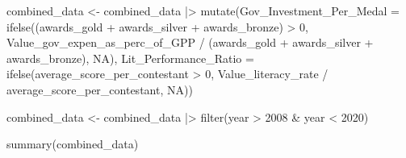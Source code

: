 \documentclass[
  letterpaper,
  DIV=11,
  numbers=noendperiod]{scrartcl}
\newenvironment{Shaded}{\begin{snugshade}}{\end{snugshade}}
\newcommand{\AttributeTok}[1]{\textcolor[rgb]{0.40,0.45,0.13}{#1}}
\newcommand{\ConstantTok}[1]{\textcolor[rgb]{0.56,0.35,0.01}{#1}}
\newcommand{\DecValTok}[1]{\textcolor[rgb]{0.68,0.00,0.00}{#1}}
\newcommand{\FunctionTok}[1]{\textcolor[rgb]{0.28,0.35,0.67}{#1}}
\newcommand{\NormalTok}[1]{\textcolor[rgb]{0.00,0.23,0.31}{#1}}
\newcommand{\OtherTok}[1]{\textcolor[rgb]{0.00,0.23,0.31}{#1}}
\newcommand{\SpecialCharTok}[1]{\textcolor[rgb]{0.37,0.37,0.37}{#1}}
\begin{document}
\begin{Shaded}
\begin{Highlighting}[]
\NormalTok{combined\_data }\OtherTok{\textless{}{-}}\NormalTok{ combined\_data }\SpecialCharTok{|\textgreater{}}
  \FunctionTok{mutate}\NormalTok{(}\AttributeTok{Gov\_Investment\_Per\_Medal =} \FunctionTok{ifelse}\NormalTok{((awards\_gold }\SpecialCharTok{+}\NormalTok{ awards\_silver }\SpecialCharTok{+}\NormalTok{ awards\_bronze) }\SpecialCharTok{\textgreater{}} \DecValTok{0}\NormalTok{, }
\NormalTok{                                           Value\_gov\_expen\_as\_perc\_of\_GPP }\SpecialCharTok{/}\NormalTok{ (awards\_gold }\SpecialCharTok{+}\NormalTok{ awards\_silver }\SpecialCharTok{+}\NormalTok{ awards\_bronze), }
                                           \ConstantTok{NA}\NormalTok{),}
         \AttributeTok{Lit\_Performance\_Ratio =} \FunctionTok{ifelse}\NormalTok{(average\_score\_per\_contestant }\SpecialCharTok{\textgreater{}} \DecValTok{0}\NormalTok{, }
\NormalTok{                                        Value\_literacy\_rate }\SpecialCharTok{/}\NormalTok{ average\_score\_per\_contestant, }
                                        \ConstantTok{NA}\NormalTok{))}

\NormalTok{combined\_data }\OtherTok{\textless{}{-}}\NormalTok{ combined\_data }\SpecialCharTok{|\textgreater{}}
  \FunctionTok{filter}\NormalTok{(year }\SpecialCharTok{\textgreater{}} \DecValTok{2008} \SpecialCharTok{\&}\NormalTok{ year }\SpecialCharTok{\textless{}} \DecValTok{2020}\NormalTok{)}


\FunctionTok{summary}\NormalTok{(combined\_data)}
\end{Highlighting}
\end{Shaded}
\end{document}
